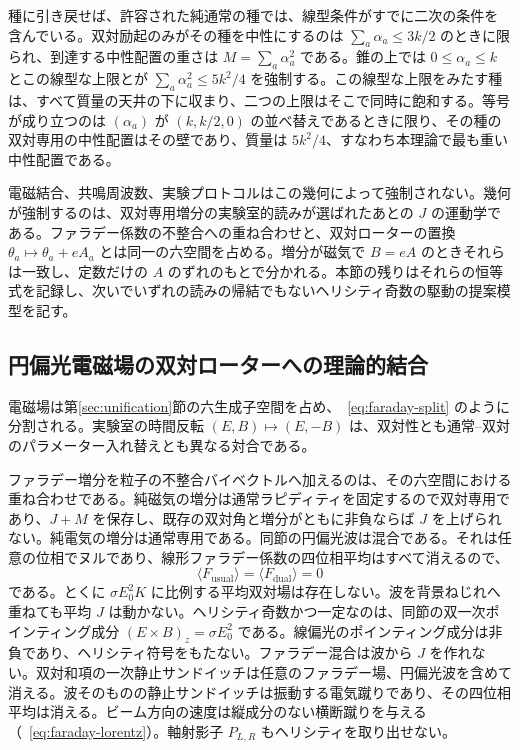 \documentclass[a4paper]{article}
\begin{document}
種に引き戻せば、許容された純通常の種では、線型条件がすでに二次の条件を含んでいる。双対励起のみがその種を中性にするのは $\sum_a\alpha_a\le 3k/2$ のときに限られ、到達する中性配置の重さは $M=\sum_a\alpha_a^2$ である。錐の上では $0\le\alpha_a\le k$ とこの線型な上限とが $\sum_a\alpha_a^2\le 5k^2/4$ を強制する。この線型な上限をみたす種は、すべて質量の天井の下に収まり、二つの上限はそこで同時に飽和する。等号が成り立つのは $(\alpha_a)$ が $(k,k/2,0)$ の並べ替えであるときに限り、その種の双対専用の中性配置はその壁であり、質量は $5k^2/4$、すなわち本理論で最も重い中性配置である。

電磁結合、共鳴周波数、実験プロトコルはこの幾何によって強制されない。幾何が強制するのは、双対専用増分の実験室的読みが選ばれたあとの $J$ の運動学である。ファラデー係数の不整合への重ね合わせと、双対ローターの置換 $\theta_a\mapsto\theta_a+e A_a$ とは同一の六空間を占める。増分が磁気で $B=eA$ のときそれらは一致し、定数だけの $A$ のずれのもとで分かれる。本節の残りはそれらの恒等式を記録し、次いでいずれの読みの帰結でもないヘリシティ奇数の駆動の提案模型を記す。

\subsection{円偏光電磁場の双対ローターへの理論的結合}

電磁場は第\ref{sec:unification}節の六生成子空間を占め、~\eqref{eq:faraday-split} のように分割される。実験室の時間反転 $(E,B)\mapsto(E,-B)$ は、双対性とも通常--双対のパラメーター入れ替えとも異なる対合である。

ファラデー増分を粒子の不整合バイベクトルへ加えるのは、その六空間における重ね合わせである。純磁気の増分は通常ラピディティを固定するので双対専用であり、$J+M$ を保存し、既存の双対角と増分がともに非負ならば $J$ を上げられない。純電気の増分は通常専用である。同節の円偏光波は混合である。それは任意の位相でヌルであり、線形ファラデー係数の四位相平均はすべて消えるので、
\[
\langle F_{\mathrm{usual}}\rangle=\langle F_{\mathrm{dual}}\rangle=0
\]
である。とくに $\sigma E_0^2 K$ に比例する平均双対場は存在しない。波を背景ねじれへ重ねても平均 $J$ は動かない。ヘリシティ奇数かつ一定なのは、同節の双一次ポインティング成分 $(E\times B)_z=\sigma E_0^2$ である。線偏光のポインティング成分は非負であり、ヘリシティ符号をもたない。ファラデー混合は波から $J$ を作れない。双対和項の一次静止サンドイッチは任意のファラデー場、円偏光波を含めて消える。波そのものの静止サンドイッチは振動する電気蹴りであり、その四位相平均は消える。ビーム方向の速度は縦成分のない横断蹴りを与える（~\eqref{eq:faraday-lorentz}）。軸射影子 $P_{L,R}$ もヘリシティを取り出せない。
\end{document}
